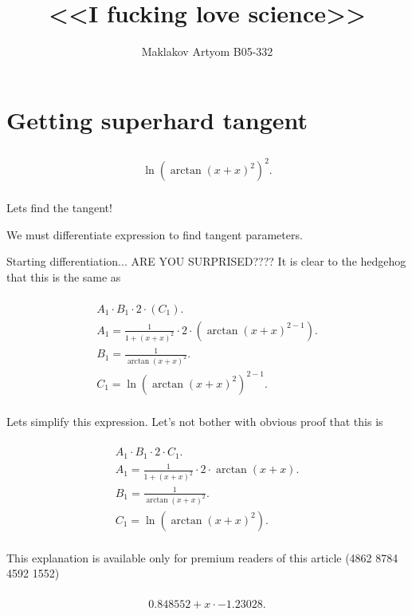 \documentclass[12pt,a4paper]{extreport}
\title{<<I fucking love science>>}
\author{Maklakov Artyom B05-332}
\begin{document}
\maketitle
\tableofcontents
\section{Getting superhard tangent}


\begin{multline}
\\
\ln(\arctan(x + x) ^ {2}) ^ {2}.\\
\end{multline}


Lets find the tangent!

We must differentiate expression to find tangent parameters.

Starting differentiation... 
ARE YOU SURPRISED????\cite{Dashkov} It is clear to the hedgehog that this is the same as 

\begin{multline}
\\
A_{1} \cdot B_{1} \cdot 2 \cdot (C_{1}).\\
A_{1} = \frac{1}{1 + (x + x) ^ {2}} \cdot 2 \cdot (\arctan(x + x) ^ {2 - 1}).\\
B_{1} = \frac{1}{\arctan(x + x) ^ {2}}.\\
C_{1} = \ln(\arctan(x + x) ^ {2}) ^ {2 - 1}.\\
\end{multline}


Lets simplify this expression.
Let's not bother with obvious proof that this is 

\begin{multline}
\\
A_{1} \cdot B_{1} \cdot 2 \cdot C_{1}.\\
A_{1} = \frac{1}{1 + (x + x) ^ {2}} \cdot 2 \cdot \arctan(x + x).\\
B_{1} = \frac{1}{\arctan(x + x) ^ {2}}.\\
C_{1} = \ln(\arctan(x + x) ^ {2}).\\
\end{multline}

This explanation is available only for premium readers of this article (4862 8784 4592 1552) 

\begin{multline}
\\
0.848552 + x \cdot -1.23028.\\
\end{multline}
\end{document}
